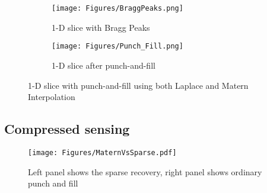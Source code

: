 \begin{figure}
     \centering
     \begin{subfigure}[b]{0.45\textwidth}
         \centering
         \texttt{[image: Figures/BraggPeaks.png]}
         \caption{1-D slice with Bragg Peaks}
         \label{fig:BraggPeaks}
     \end{subfigure}
     \hfill
     \begin{subfigure}[b]{0.45\textwidth}
         \centering
         \texttt{[image: Figures/Punch\_Fill.png]}
         \caption{1-D slice after punch-and-fill}
         \label{fig:punch_fill}
     \end{subfigure}
        \caption{1-D slice with punch-and-fill using both Laplace and Matern Interpolation}
        \label{fig:punch_and_fill}
\end{figure}
\subsection{Compressed sensing}

\begin{figure}
\texttt{[image: Figures/MaternVsSparse.pdf]}
\caption{\label{fig:VO2} Left panel shows the sparse recovery, right panel shows ordinary punch and fill}
\end{figure}

